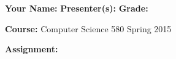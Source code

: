 \documentclass[letterpaper, 10pt]{article} %
\begin{document}
\pagestyle{empty}

\vspace*{-1.2in}

\noindent
{\bf Your Name:} \hspace*{2in} {\bf Presenter(s):} \hspace*{2in} {\bf Grade:} 

\vspace*{.1in}

\noindent
{\bf Course:} Computer Science 580 Spring 2015 

\vspace*{.1in}

\noindent
{\bf Assignment:} 

\vspace*{.1in}
\end{document}
